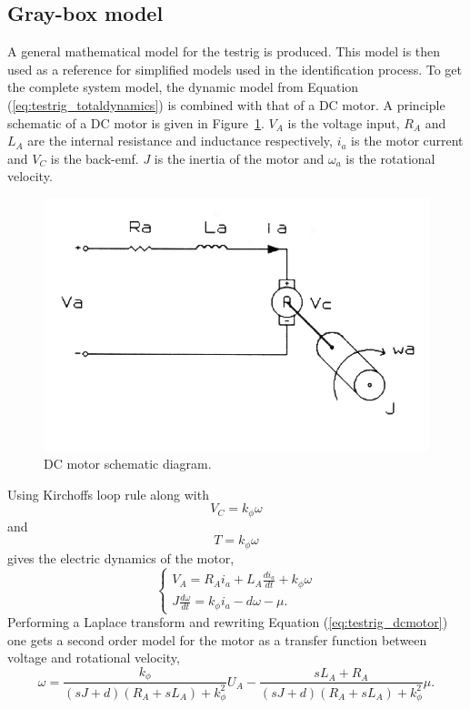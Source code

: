 \subsection{Gray-box model}
A general mathematical model for the testrig is produced. This model is then used
as a reference for simplified models used in the identification process.
To get the complete system model, the dynamic model from
Equation (\ref{eq:testrig_totaldynamics}) is combined with that of a DC motor. A
principle schematic of a DC motor is given in
Figure~\ref{fig:testrig_dcmotor_model}. $V_A$ is the voltage input, $R_A$ and
$L_A$ are the internal resistance and inductance respectively, $i_a$ is the
motor current and $V_C$ is the back-emf. $J$ is the inertia of the motor and
$\omega_a$ is the rotational velocity.
\begin{figure}[H]
    \centering
    \includegraphics[width=\textwidth]{./img/testrig_dcmotor_model.png}
    \caption{DC motor schematic diagram.}\label{fig:testrig_dcmotor_model}
\end{figure}
Using Kirchoffs loop rule along with 
\begin{equation} \label{eq:testrig_kphi_v}
    V_C = k_{\phi} \omega
\end{equation}
and 
\begin{equation} \label{eq:testrig_kphi_i}
    T = k_{\phi} \omega
\end{equation}
gives the electric dynamics of the motor,
\begin{equation} \label{eq:testrig_dcmotor}
    \begin{cases} 
        V_A = R_A i_a + L_A \frac{di_a}{dt} + k_{\phi}\omega \\
        J \frac{d\omega} {dt} = k_{\phi} i_a - d\omega - \mu. 
    \end{cases}
\end{equation}
Performing a Laplace transform and rewriting Equation (\ref{eq:testrig_dcmotor})
one gets a second order model for the motor as a transfer function between
voltage and rotational velocity,
\begin{equation} \label{eq:testrig_motor_2ndorder}
    \omega = \frac {k_{\phi}} {(sJ + d) (R_A + sL_A) + k_{\phi}^2} U_A -
    \frac {sL_A + R_A} {(sJ + d) (R_A + sL_A) + k_{\phi}^2} \mu.
\end{equation}
